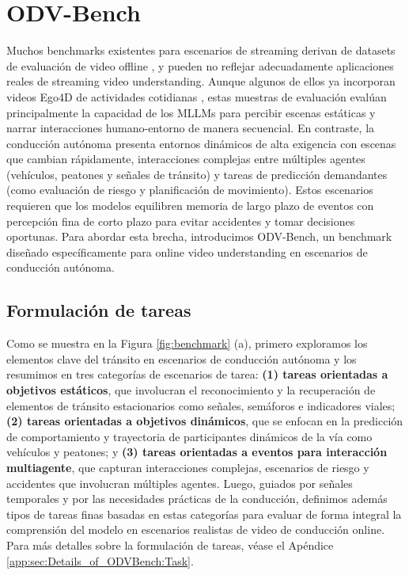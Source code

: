 \section{ODV-Bench}
\label{sec:Benchmark}


Muchos benchmarks existentes para escenarios de streaming derivan de datasets de evaluación de video offline \cite{lin2024streamingbench,huang2024videochatonline,li2025ovobench,xiong2025streamchat}, y pueden no reflejar adecuadamente aplicaciones reales de streaming video understanding. 
Aunque algunos de ellos ya incorporan videos Ego4D de actividades cotidianas \cite{li2025ovobench,xiong2025streamchat}, estas muestras de evaluación evalúan principalmente la capacidad de los MLLMs para percibir escenas estáticas y narrar interacciones humano-entorno de manera secuencial. 
En contraste, la conducción autónoma presenta entornos dinámicos de alta exigencia con escenas que cambian rápidamente, interacciones complejas entre múltiples agentes (vehículos, peatones y señales de tránsito) y tareas de predicción demandantes (como evaluación de riesgo y planificación de movimiento). Estos escenarios requieren que los modelos equilibren memoria de largo plazo de eventos con percepción fina de corto plazo para evitar accidentes y tomar decisiones oportunas. Para abordar esta brecha, introducimos ODV-Bench, un benchmark diseñado específicamente para online video understanding en escenarios de conducción autónoma.


\subsection{Formulación de tareas}
Como se muestra en la Figura \ref{fig:benchmark} (a), primero exploramos los elementos clave del tránsito en escenarios de conducción autónoma y los resumimos en tres categorías de escenarios de tarea:\textbf{ (1) tareas orientadas a objetivos estáticos}, que involucran el reconocimiento y la recuperación de elementos de tránsito estacionarios como señales, semáforos e indicadores viales; \textbf{ (2) tareas orientadas a objetivos dinámicos}, que se enfocan en la predicción de comportamiento y trayectoria de participantes dinámicos de la vía como vehículos y peatones; y \textbf{ (3) tareas orientadas a eventos para interacción multiagente}, que capturan interacciones complejas, escenarios de riesgo y accidentes que involucran múltiples agentes. Luego, guiados por señales temporales y por las necesidades prácticas de la conducción, definimos además tipos de tareas finas basadas en estas categorías para evaluar de forma integral la comprensión del modelo en escenarios realistas de video de conducción online. Para más detalles sobre la formulación de tareas, véase el Apéndice \ref{app:sec:Details_of_ODVBench:Task}.


